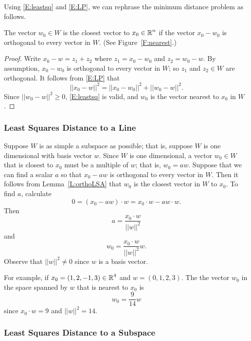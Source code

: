\documentclass{ximera}
\begin{document}
Using \eqref{E:leastsq} and \eqref{E:LP}, we can rephrase the minimum distance 
problem as follows.
\begin{lemma}  \label{L:orthoLSA}
The vector $w_0\in W$ is the closest vector to $x_0\in\mbox{$\Bbb{R}$}^n$ if the vector 
$x_0-w_0$ is orthogonal to every vector in $W$. (See Figure~\ref{F:nearest}.)
\end{lemma}

\begin{proof}  Write $x_0-w=z_1+z_2$ where $z_1=x_0-w_0$ and $z_2=w_0-w$.  By 
assumption, $x_0-w_0$ is orthogonal to every vector in $W$; so $z_1$ and 
$z_2\in W$ are orthogonal.  It follows from \eqref{E:LP} that
\[
||x_0-w||^2 = ||x_0-w_0||^2 + ||w_0-w||^2.
\]
Since $||w_0-w||^2\ge 0$, \eqref{E:leastsq} is valid, and $w_0$ is the vector 
nearest to $x_0$ in $W$. \end{proof}

\subsubsection*{Least Squares Distance to a Line}

Suppose $W$ is as simple a subspace as possible; that is, suppose $W$ is one
dimensional with basis vector $w$.  Since $W$ is one dimensional, a vector
$w_0\in W$ that is closest to $x_0$ must be a multiple of $w$; that is,
$w_0=aw$.  Suppose that we can find a scalar $a$ so that $x_0-aw$ is
orthogonal to every vector in $W$.  Then it follows from
Lemma~\ref{L:orthoLSA} that $w_0$ is the closest vector in $W$ to $x_0$.
To find $a$, calculate
\[
0 = (x_0-aw)\cdot w = x_0\cdot w - a w\cdot w.
\]
Then
\[
a = \frac{x_0\cdot w}{||w||^2}
\]
and
\begin{equation}  \label{E:singleortho}
w_0 = \frac{x_0\cdot w}{||w||^2} w.
\end{equation}
Observe that $||w||^2\not=0$ since $w$ is a basis vector.

For example, if $x_0=(1,2,-1,3)\in\mbox{$\Bbb{R}$}^4$ and $w=(0,1,2,3)$.  The the vector
$w_0$ in the space spanned by $w$ that is nearest to $x_0$ is
\[
w_0 = \frac{9}{14}w
\]
since $x_0\cdot w=9$ and $||w||^2=14$.

\subsubsection*{Least Squares Distance to a Subspace}
\end{document}
